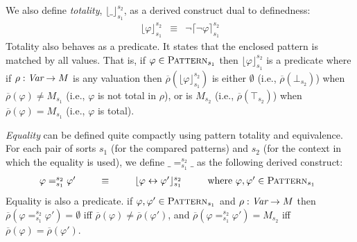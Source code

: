 \documentclass[UTF8,11pt]{article}
\theoremstyle{plain}
\theoremstyle{definition}
\theoremstyle{remark}
\newcommand{\Pattern}{\textsc{Pattern}\xspace}
\newcommand{\ra}{\rightarrow}
\newcommand{\lra}{\leftrightarrow}
\begin{document}
We also define \emph{totality}, $\lfloor\_\rfloor_{s_1}^{s_2}$, as a derived
construct dual to definedness:
$$
\begin{array}{lcl}
\lfloor\varphi\rfloor_{s_1}^{s_2}
& \equiv &
\neg\lceil\neg\varphi\rceil_{s_1}^{s_2}
\end{array}
$$
Totality also behaves as a predicate.
It states that the enclosed pattern is matched by all values.
That is, if $\varphi \in \Pattern_{s_1}$ then $\lfloor\varphi\rfloor_{s_1}^{s_2}$
is a predicate where if $\rho : \Var \ra M$ is any valuation
then $\overline{\rho}(\lfloor\varphi\rfloor_{s_1}^{s_2})$ is either $\emptyset$
(i.e., $\overline{\rho}(\bot_{s_2})$)
when $\overline{\rho}(\varphi) \neq M_{s_1}$
(i.e., $\varphi$ is not total in $\rho$), or is $M_{s_2}$
(i.e., $\overline{\rho}(\top_{s_2})$) 
when $\overline{\rho}(\varphi) = M_{s_1}$
(i.e., $\varphi$ is total).

\emph{Equality} can be defined quite compactly using pattern totality and
equivalence.
For each pair of sorts $s_1$ (for the compared patterns) and
$s_2$ (for the context in which the equality is used), we define
$\_=_{s_1}^{s_2}\_$ as the following derived construct:
$$
\begin{array}{@{}rcll}
\varphi =_{s_1}^{s_2} \varphi' & \ \ \ \ \ \equiv \ \ \ \ \ &
\lfloor\varphi \lra \varphi'\rfloor_{s_1}^{s_2}
& \ \ \ \ \ \mbox{where } \varphi,\varphi' \in \Pattern_{s_1}
\end{array}
$$
Equality is also a predicate.
if $\varphi,\varphi' \in \Pattern_{s_1}$ and $\rho : \Var \ra M$ then
$\overline{\rho}(\varphi =_{s_1}^{s_2} \varphi') = \emptyset$
iff $\overline{\rho}(\varphi) \neq \overline{\rho}(\varphi')$, and
$\overline{\rho}(\varphi =_{s_1}^{s_2} \varphi') = M_{s_2}$
iff $\overline{\rho}(\varphi) = \overline{\rho}(\varphi')$.
\end{document}
